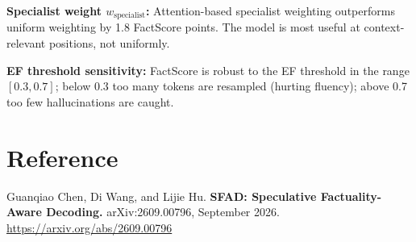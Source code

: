 \documentclass[10pt,twocolumn]{article}
\begin{document}
\textbf{Specialist weight $w_\mathrm{specialist}$:} Attention-based
specialist weighting outperforms uniform weighting by 1.8 FactScore
points. The model is most useful at context-relevant positions,
not uniformly.

\textbf{EF threshold sensitivity:} FactScore is robust to the EF
threshold in the range $[0.3, 0.7]$; below 0.3 too many tokens are
resampled (hurting fluency); above 0.7 too few hallucinations are caught.

\section*{Reference}

Guanqiao Chen, Di Wang, and Lijie Hu.
\textbf{SFAD: Speculative Factuality-Aware Decoding.}
arXiv:2609.00796, September 2026.
\url{https://arxiv.org/abs/2609.00796}
\end{document}
